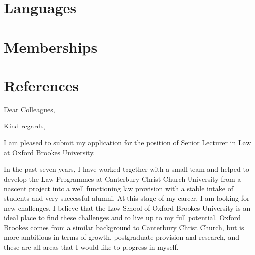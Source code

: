 \documentclass[11pt,a4paper]{moderncv}
\begin{document}
\section{Languages}

\section{Memberships}


\section{References}

\clearpage

\date{23 June 2017}
\opening{Dear Colleagues,}
\closing{Kind regards,}
\subject{Application for the position of Senior Lecturer in Law}
\makelettertitle

I am pleased to submit my application for the position of Senior Lecturer in Law at Oxford Brookes University.

In the past seven years, I have worked together with a small team and helped to develop the Law Programmes at Canterbury Christ Church University from a nascent project into a well functioning law provision with a stable intake of students and very successful alumni. At this stage of my career, I am looking for new challenges. I believe that the Law School of Oxford Brookes University is an ideal place to find these challenges and to live up to my full potential. Oxford Brookes comes from a similar background to Canterbury Christ Church, but is more ambitious in terms of growth, postgraduate provision and research, and these are all areas that I would like to progress in myself.
\end{document}
